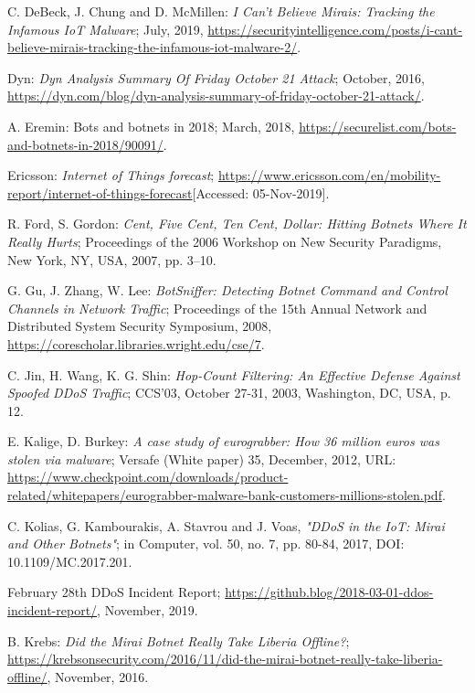 \begin{thebibliography}{99}
 C. DeBeck, J. Chung and D. McMillen: \emph{I Can't Believe Mirais: Tracking the Infamous IoT Malware}; July, 2019, \url{https://securityintelligence.com/posts/i-cant-believe-mirais-tracking-the-infamous-iot-malware-2/}.

 Dyn: \emph{Dyn Analysis Summary Of Friday October 21 Attack}; October, 2016, \url{https://dyn.com/blog/dyn-analysis-summary-of-friday-october-21-attack/}.

  A. Eremin: Bots and botnets in 2018; March, 2018, \url{https://securelist.com/bots-and-botnets-in-2018/90091/}.

 Ericsson: \emph{Internet of Things forecast}; \url{https://www.ericsson.com/en/mobility-report/internet-of-things-forecast}[Accessed: 05-Nov-2019].

 R. Ford, S. Gordon: \emph{Cent, Five Cent, Ten Cent, Dollar: Hitting Botnets Where It Really Hurts}; Proceedings of the 2006 Workshop on New Security Paradigms, New York, NY, USA, 2007, pp. 3--10.

 G. Gu, J. Zhang, W. Lee: \emph{BotSniffer: Detecting Botnet Command and Control Channels in Network Traffic}; Proceedings of the 15th Annual Network and Distributed System Security Symposium, 2008, \url{https://corescholar.libraries.wright.edu/cse/7}.

 C. Jin, H. Wang, K. G. Shin: \emph{Hop-Count Filtering: An Effective Defense Against Spoofed DDoS Traffic}; CCS'03, October 27-31, 2003, Washington, DC, USA, p. 12.

 E. Kalige, D. Burkey: \emph{A case study of eurograbber: How 36 million euros was stolen via malware}; Versafe (White paper) 35, December, 2012, URL: \url{https://www.checkpoint.com/downloads/product-related/whitepapers/eurograbber-malware-bank-customers-millions-stolen.pdf}.

 C. Kolias, G. Kambourakis, A. Stavrou and J. Voas, \emph{"DDoS in the IoT: Mirai and Other Botnets"}; in Computer, vol. 50, no. 7, pp. 80-84, 2017, DOI: 10.1109/MC.2017.201.

 February 28th DDoS Incident Report; \url{https://github.blog/2018-03-01-ddos-incident-report/}, November, 2019.

 B. Krebs: \emph{Did the Mirai Botnet Really Take Liberia Offline?}; \url{https://krebsonsecurity.com/2016/11/did-the-mirai-botnet-really-take-liberia-offline/}, November, 2016.


\end{thebibliography}

